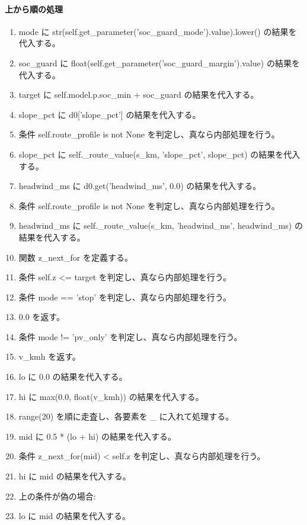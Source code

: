 \documentclass[a4paper,11pt]{article}
\begin{document}
            \paragraph{上から順の処理}
            \begin{enumerate}[leftmargin=1.8em]
            \item mode に str(self.get\_parameter('soc\_guard\_mode').value).lower() の結果を代入する。
\item soc\_guard に float(self.get\_parameter('soc\_guard\_margin').value) の結果を代入する。
\item target に self.model.p.soc\_min + soc\_guard の結果を代入する。
\item slope\_pct に d0['slope\_pct'] の結果を代入する。
\item 条件 self.route\_profile is not None を判定し、真なら内部処理を行う。
\item   slope\_pct に self.\_route\_value(s\_km, 'slope\_pct', slope\_pct) の結果を代入する。
\item headwind\_ms に d0.get('headwind\_ms', 0.0) の結果を代入する。
\item 条件 self.route\_profile is not None を判定し、真なら内部処理を行う。
\item   headwind\_ms に self.\_route\_value(s\_km, 'headwind\_ms', headwind\_ms) の結果を代入する。
\item 関数 z\_next\_for を定義する。
\item 条件 self.z <= target を判定し、真なら内部処理を行う。
\item   条件 mode == 'stop' を判定し、真なら内部処理を行う。
\item     0.0 を返す。
\item   条件 mode != 'pv\_only' を判定し、真なら内部処理を行う。
\item     v\_kmh を返す。
\item   lo に 0.0 の結果を代入する。
\item   hi に max(0.0, float(v\_kmh)) の結果を代入する。
\item   range(20) を順に走査し、各要素を \_ に入れて処理する。
\item     mid に 0.5 * (lo + hi) の結果を代入する。
\item     条件 z\_next\_for(mid) < self.z を判定し、真なら内部処理を行う。
\item       hi に mid の結果を代入する。
\item       上の条件が偽の場合:
\item       lo に mid の結果を代入する。

\end{enumerate}
\end{document}
